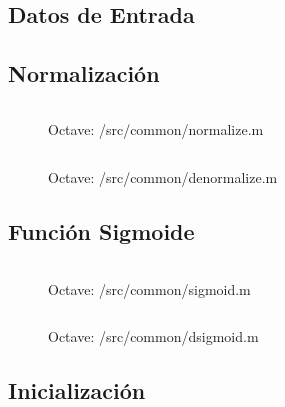 \documentclass[10pt, a4paper,spanish]{article}
\begin{document}
		\subsection{Datos de Entrada}

			\paragraph{}


		\subsection{Normalización}

			\begin{figure}[htpb!]
				\centering
				\inputminted{octave}{../src/common/normalize.m}
				\caption{Octave: /src/common/normalize.m}
				\label{code:main}
			\end{figure}


			\begin{figure}[htpb!]
				\centering
				\inputminted{octave}{../src/common/denormalize.m}
				\caption{Octave: /src/common/denormalize.m}
				\label{code:main}
			\end{figure}

		\subsection{Función Sigmoide}
			\paragraph{}

			\begin{figure}[htpb!]
				\centering
				\inputminted{octave}{../src/common/sigmoid.m}
				\caption{Octave: /src/common/sigmoid.m}
				\label{code:main}
			\end{figure}


			\begin{figure}[htpb!]
				\centering
				\inputminted{octave}{../src/common/dsigmoid.m}
				\caption{Octave: /src/common/dsigmoid.m}
				\label{code:main}
			\end{figure}


		\subsection{Inicialización}
			\paragraph{}
\end{document}

